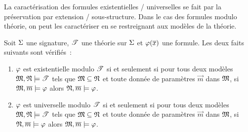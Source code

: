 La caractérisation des formules existentielles / universelles se fait par la
préservation par extension / sous-structure. Dans le cas des formules modulo
théorie, on peut les caractériser en se restreignant aux modèles de la théorie.

\begin{theorem}
  Soit $\Sigma$ une signature, $\mathscr T$ une théorie sur $\Sigma$ et
  $\varphi(\overline{x})$ une formule. Les deux faits suivants sont vérifiés~:
  \begin{enumerate}[label=(\roman*)]
  \item\label{item.ext.exist}
    $\varphi$ est existentielle modulo $\mathscr T$ si et seulement si pour tous
    deux modèles $\mathfrak{M},\mathfrak{N}\models\mathscr T$ tels que $\mathfrak{M}\subseteq\mathfrak{N}$ et
    toute donnée de paramètres $\vec m$ dans $\mathfrak{M}$, si
    $\mathfrak{M},\overline{m}\models\varphi$ alors $\mathfrak{N},\overline{m} \models\varphi$.
  \item $\varphi$ est universelle modulo $\mathscr T$ si et seulement si pour tous
    deux modèles $\mathfrak{M},\mathfrak{N}\models\mathscr T$ tels que $\mathfrak{M}\subseteq\mathfrak{N}$ et
    toute donnée de paramètres $\vec m$ dans $\mathfrak{M}$, si
    $\mathfrak{N},\overline{m}\models\varphi$ alors $\mathfrak{M},\overline{m}\models\varphi$.
  \end{enumerate}
\end{theorem}


